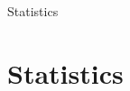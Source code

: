 \documentclass[12pt]{article}
\begin{document}
\begin{titlepage}
    \begin{center}
        \Huge Statistics
    \end{center}
\end{titlepage}

\newpage
\tableofcontents

\section{Statistics}
    
\end{document}
